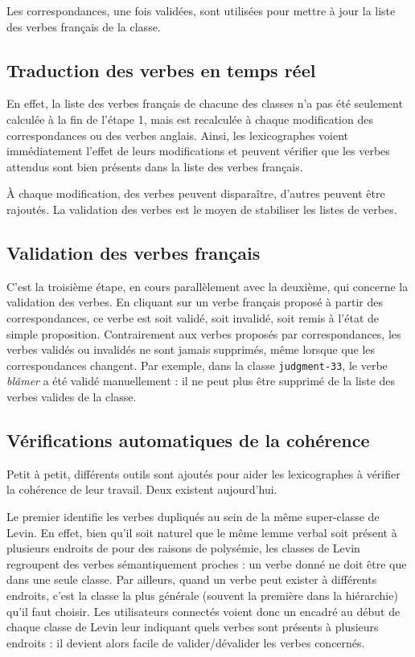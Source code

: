 Les correspondances, une fois validées, sont utilisées pour mettre à jour la
liste des verbes français de la classe.

\subsection{Traduction des verbes en temps réel}

En effet, la liste des verbes français de chacune des classes n'a pas été
seulement calculée à la fin de l'étape 1, mais est recalculée à chaque
modification des correspondances ou des verbes anglais. Ainsi, les
lexicographes voient immédiatement l'effet de leurs modifications et peuvent
vérifier que les verbes attendus sont bien présents dans la liste des verbes
français.

À chaque modification, des verbes peuvent disparaître, d'autres peuvent être
rajoutés. La validation des verbes est le moyen de stabiliser les listes de
verbes.

\subsection{Validation des verbes français}

C'est la troisième étape, en cours parallèlement avec la deuxième, qui concerne
la validation des verbes. En cliquant sur un verbe français proposé à partir
des correspondances, ce verbe est soit validé, soit invalidé, soit remis à
l'état de simple proposition. Contrairement aux verbes proposés par
correspondances, les verbes validés ou invalidés ne sont jamais supprimés, même
lorsque que les correspondances changent. Par exemple, dans la classe
\texttt{judgment-33}, le verbe \textit{blâmer} a été validé manuellement : il ne
peut plus être supprimé de la liste des verbes valides de la classe.

\subsection{Vérifications automatiques de la cohérence}

Petit à petit, différents outils sont ajoutés pour aider les lexicographes à
vérifier la cohérence de leur travail. Deux existent aujourd'hui.

Le premier identifie les verbes dupliqués au sein de la même super-classe de
Levin. En effet, bien qu'il soit naturel que le même lemme verbal soit présent
à plusieurs endroits de \verbenet{} pour des raisons de polysémie, les classes
de Levin regroupent des verbes sémantiquement proches : un verbe donné ne doit
être que dans une seule classe. Par ailleurs, quand un verbe peut exister à
différents endroits, c'est la classe la plus générale (souvent la première dans
la hiérarchie) qu'il faut choisir. Les utilisateurs connectés voient donc un
encadré au début de chaque classe de Levin leur indiquant quels verbes sont
présents à plusieurs endroits : il devient alors facile de valider/dévalider
les verbes concernés.


